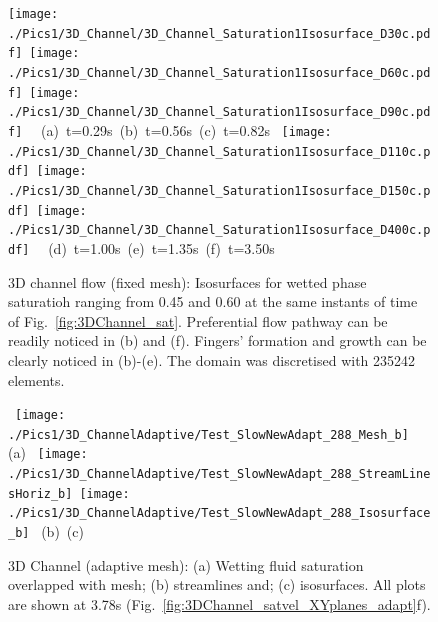 \begin{landscape}
  \begin{figure}[ht]
  \vbox{\vspace{-.5cm}
      \hbox{\texttt{[image: ./Pics1/3D\_Channel/3D\_Channel\_Saturation1Isosurface\_D30c.pdf]} 
            \texttt{[image: ./Pics1/3D\_Channel/3D\_Channel\_Saturation1Isosurface\_D60c.pdf]}
            \texttt{[image: ./Pics1/3D\_Channel/3D\_Channel\_Saturation1Isosurface\_D90c.pdf]} }
      \hbox{\hspace{2.0cm} (a) t=0.29s \hspace{6.cm} (b) t=0.56s \hspace{4.cm} (c) t=0.82s}
      \vspace{0.5cm}
      \hbox{\hspace{.5cm} \texttt{[image: ./Pics1/3D\_Channel/3D\_Channel\_Saturation1Isosurface\_D110c.pdf]}
            \texttt{[image: ./Pics1/3D\_Channel/3D\_Channel\_Saturation1Isosurface\_D150c.pdf]}
            \texttt{[image: ./Pics1/3D\_Channel/3D\_Channel\_Saturation1Isosurface\_D400c.pdf]} }
      \hbox{\hspace{3.cm} (d) t=1.00s \hspace{3.cm} (e) t=1.35s\hspace{4.cm} (f) t=3.50s }}
\caption{3D channel flow (fixed mesh): Isosurfaces for wetted phase saturatioh ranging from 0.45 and 0.60 at the same instants of time of Fig.~\ref{fig:3DChannel_sat}. Preferential flow pathway can be readily noticed in (b) and (f). Fingers' formation and growth can be clearly noticed in (b)-(e). The domain was discretised with 235242  elements.}
\label{fig:3DChannel_Isosurf}
\end{figure}
\end{landscape}
\clearpage


\begin{landscape}
  \begin{figure}[ht] 
    \vbox{\vspace{0.cm}
        \hbox{\hspace{5.cm}
          \texttt{[image: ./Pics1/3D\_ChannelAdaptive/Test\_SlowNewAdapt\_288\_Mesh\_b]} }
        \hbox{\hspace{10cm}(a)}
      \vspace{.5cm} 
         \hbox{\hspace{0.cm}
             \texttt{[image: ./Pics1/3D\_ChannelAdaptive/Test\_SlowNewAdapt\_288\_StreamLinesHoriz\_b]} 
      \hspace{.5cm} 
             \texttt{[image: ./Pics1/3D\_ChannelAdaptive/Test\_SlowNewAdapt\_288\_Isosurface\_b]} 
         }
        \hbox{\hspace{6cm}(b) \hspace{8cm}(c)}
    }
\caption{3D Channel (adaptive mesh): (a) Wetting fluid saturation overlapped with mesh; (b) streamlines and; (c) isosurfaces. All plots are shown at 3.78s (Fig.~\ref{fig:3DChannel_satvel_XYplanes_adapt}f). }
\label{fig:3DChannel_severalfields_adapt}
\end{figure}
\end{landscape}
\clearpage

